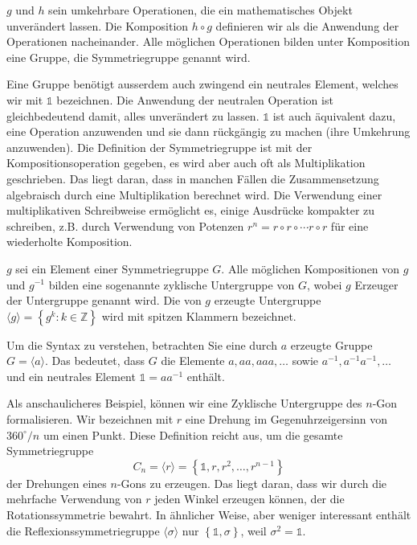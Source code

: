 \begin{definition}[Symmetriegruppe]
	\(g\) und \(h\) sein umkehrbare Operationen, die ein mathematisches Objekt
	unverändert lassen. Die Komposition \(h\circ g\) definieren wir als die Anwendung 
	der Operationen nacheinander. Alle möglichen Operationen bilden unter Komposition eine Gruppe, 
	die Symmetriegruppe genannt wird.
\end{definition} %

Eine Gruppe benötigt ausserdem auch zwingend ein neutrales Element, welches wir
mit \(\mathds{1}\) bezeichnen. Die Anwendung der neutralen Operation ist
gleichbedeutend damit, alles unverändert zu lassen. \(\mathds{1}\) ist auch
äquivalent dazu, eine Operation anzuwenden und sie dann rückgängig zu machen
(ihre Umkehrung anzuwenden).
Die Definition der Symmetriegruppe ist mit der Kompositionsoperation gegeben,
es wird aber auch oft als Multiplikation geschrieben. Das liegt daran, dass
in manchen Fällen die Zusammensetzung algebraisch durch eine Multiplikation berechnet
wird. Die Verwendung einer multiplikativen Schreibweise ermöglicht es, einige
Ausdrücke kompakter zu schreiben, z.B. durch Verwendung von Potenzen \(r^n =
r\circ r \circ \cdots r\circ r\) für eine wiederholte Komposition. 

\begin{definition}
	\(g\) sei ein Element einer Symmetriegruppe \(G\). Alle möglichen
	Kompositionen von \(g\) und \(g^{-1}\) bilden eine sogenannte zyklische
	Untergruppe von \(G\), wobei \(g\) Erzeuger der Untergruppe genannt wird. Die von \(g\)
	erzeugte Untergruppe \(\langle g \rangle = \left\{ g^k : k \in \mathbb{Z}
	\right\}\) wird mit spitzen Klammern bezeichnet.
\end{definition}
\begin{beispiel}
	Um die Syntax zu verstehen, betrachten Sie eine durch \(a\) erzeugte Gruppe
	\(G = \langle a \rangle\).  Das bedeutet, dass \(G\) die Elemente \(a, aa,
	aaa, \ldots\) sowie \(a^{-1}, a^{-1}a^{-1}, \ldots\) und ein neutrales
	Element \(\mathds{1} = aa^{-1}\) enthält.
\end{beispiel}
\begin{beispiel}
	Als anschaulicheres Beispiel, können wir eine Zyklische Untergruppe des \(n\)-Gon 
	formalisieren. Wir bezeichnen mit \(r\) eine Drehung im Gegenuhrzeigersinn
	von \(360^\circ/n\) um einen Punkt.  Diese Definition reicht aus, um die
	gesamte Symmetriegruppe
	\[
		C_n = \langle r \rangle
			= \left\{\mathds{1}, r, r^2, \ldots, r^{n-1}\right\}
	\]
	der Drehungen eines \(n\)-Gons zu erzeugen. Das liegt daran, dass wir durch
	die mehrfache Verwendung von \(r\) jeden Winkel erzeugen k\"onnen, der die
	Rotationssymmetrie bewahrt. In ähnlicher Weise, aber weniger interessant  
	enthält die Reflexionssymmetriegruppe \(\langle\sigma\rangle\) nur
	\(\left\{\mathds{1}, \sigma\right\}\), weil \(\sigma^2 = \mathds{1}\).
\end{beispiel}

